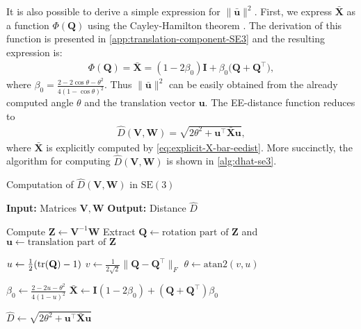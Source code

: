 It is also possible to derive a simple expression for $\|\bar{\mathbf{u}}\|^2$. First, we express $\bar{\mathbf{X}}$ as a function $\Phi(\mathbf{Q})$ using the Cayley-Hamilton theorem \citep[p. 63]{Chen2009}. The derivation of this function is presented in \cref{app:translation-component-SE3} and the resulting expression is:
\begin{align}
    \Phi(\mathbf{Q}) = \bar{\mathbf{X}} = (1-2\beta_0)\mathbf{I} + \beta_0\bigl(\mathbf{Q} + \mathbf{Q}^\top\bigr), \label{eq:explicit-X-bar-eedist}
\end{align}
where $\beta_0=\frac{2-2\cos\theta-\theta^2}{4(1 - \cos\theta)^2}$. Thus $\|\bar{\mathbf{u}}\|^2$ can be easily obtained from the already computed angle $\theta$ and the translation vector $\mathbf{u}$. The EE-distance function reduces to
\begin{align}
    \widehat{D}(\mathbf{V}, \mathbf{W}) = \sqrt{2\theta^2 + \mathbf{u}^\top\bar{\mathbf{X}}\mathbf{u}}, \label{eq:explicit-EE-distance-SE3}
\end{align}
where $\bar{\mathbf{X}}$ is explicitly computed by \eqref{eq:explicit-X-bar-eedist}. More succinctly, the algorithm for computing $\widehat{D}(\mathbf{V}, \mathbf{W})$ is shown in \cref{alg:dhat-se3}.
\begin{algorithm}
    \caption{Computation of $\widehat{D}(\mathbf{V}, \mathbf{W})$ in $\text{SE}(3)$}
    \label{alg:dhat-se3}
    \begin{algorithmic}[1]
        \Statex \textbf{Input:} Matrices $\mathbf{V}, \mathbf{W}$
        \Statex \textbf{Output:} Distance $\widehat{D}$
        
        \State Compute $\mathbf{Z} \gets \mathbf{V}^{-1}\mathbf{W}$
        \State Extract $\mathbf{Q} \gets \text{rotation part of } \mathbf{Z}$ and $\mathbf{u} \gets \text{translation part of } \mathbf{Z}$

        \State $u \gets \frac{1}{2} (\operatorname{tr}(\mathbf{Q}) - 1)$
        \State $v \gets \frac{1}{2\sqrt{2}} \|\mathbf{Q} - \mathbf{Q}^\top\|_F$
        \State $\theta \gets \text{atan2}(v, u)$

        \State $\beta_0 \gets \frac{2 - 2u - \theta^2}{4(1 - u)^2}$
        \State $\bar{\mathbf{X}} \gets \mathbf{I}(1 - 2\beta_0) + (\mathbf{Q} + \mathbf{Q}^\top)\beta_0$

        \State $\widehat{D} \gets \sqrt{2\theta^2 + \mathbf{u}^\top \bar{\mathbf{X}} \mathbf{u}}$
    \end{algorithmic}
\end{algorithm}

